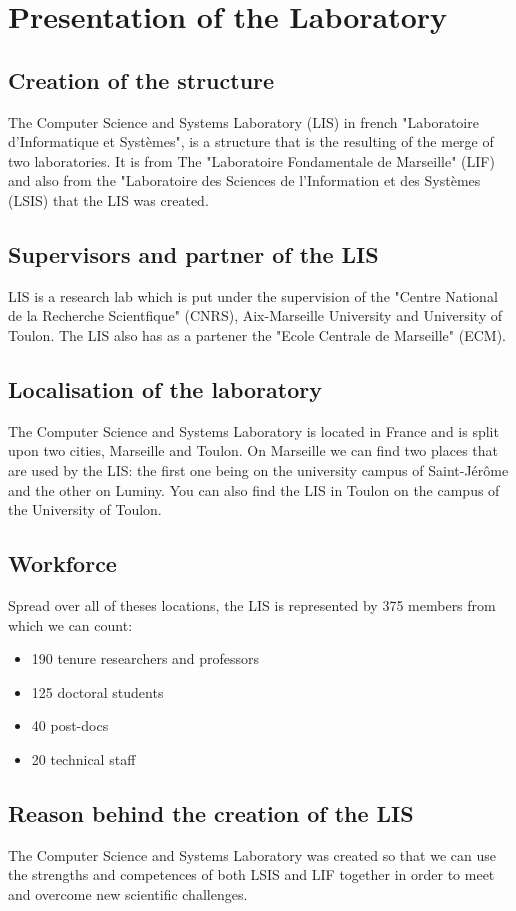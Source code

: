 \chapter{Presentation of the Laboratory}
\section{Creation of the structure}
The Computer Science and Systems Laboratory (LIS) in french "Laboratoire d’Informatique et Systèmes", is a structure that is the resulting of the merge of two laboratories. It is from The "Laboratoire Fondamentale de Marseille" (LIF) and also from the "Laboratoire des Sciences de l'Information et des Systèmes (LSIS) that the LIS was created.

\section{Supervisors and partner of the LIS}
LIS is a research lab which is put under the supervision of the "Centre National de la Recherche Scientfique" (CNRS), Aix-Marseille University and University of Toulon. The LIS also has as a partener the "Ecole Centrale de Marseille" (ECM).

\section{Localisation of the laboratory}
The Computer Science and Systems Laboratory is located in France and is split upon two cities, Marseille and Toulon. On Marseille we can find two places that are used by the LIS: the first one being on the university campus of Saint-Jérôme and the other on Luminy. You can also find the LIS in Toulon on the campus of the University of Toulon.
 
\section{Workforce}
Spread over all of theses locations, the LIS is represented by 375 members from which we can count:
\begin{itemize}[noitemsep, nolistsep]
	\item{190 tenure researchers and professors}
	\item{125 doctoral students}
	\item{40 post-docs }
	\item{20 technical staff}
\end{itemize} 

\section{Reason behind the creation of the LIS}
The Computer Science and Systems Laboratory was created so that we can use the strengths and competences of both LSIS and LIF together in order to meet and overcome new scientific challenges.

